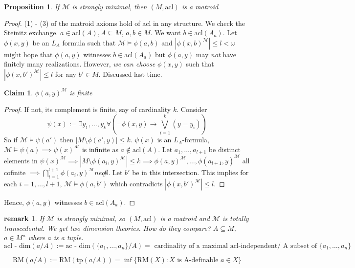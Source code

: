 \documentclass[letterpaper, 12pt]{article}
\newcommand{\fin}{\qquad \quad \hfill \framebox[1.75mm][l]{\,}}
\newcommand{\cM}{\mathcal{M}}
\newcommand{\tp}{\mbox{tp}}
\newcommand{\RM}{\mbox{RM}}
\providecommand{\abs}[1]{\left\lvert#1\right\rvert}
\newcommand{\acl}{\mbox{acl}}
\theoremstyle{stdthm}
\newtheorem{prop}[thm]{Proposition}
\theoremstyle{stddef}
\newtheorem{rem}[thm]{remark} %
\theoremstyle{stdnonum}
\newtheorem{claim}{Claim}
\theoremstyle{stdqands}
\theoremstyle{stdbold}
\begin{document}
\begin{prop}
If $\cM $ is strongly minimal, then $(M,\acl)$ is a matroid
\end{prop}

\begin{proof}
(1) - (3) of the matroid axioms hold of acl in any structure. We check the Steinitz exchange. $a \in \acl(A), A\subseteq M$, $a,b \in M$. We want $b \in \acl(A_a)$. Let $\phi(x,y)$ be an $L_A$ formula such that $\cM \models \phi(a,b)$ and $|\phi(x,b)^\cM| \leq l < \omega$ might hope that $\phi(a,y)$ witnesses $b \in \acl(A_a)$ but $\phi(a,y)$ may \emph{not} have finitely many realizations. However, \emph{we can choose} $\phi(x,y)$ such that $|\phi(x,b')^\cM| \leq l$ for any $b' \in M$. Discussed last time. 

\begin{claim}
$\phi(a,y)^\cM$ is finite
\end{claim}

\begin{proof}
If not, its complement is finite, say of cardinality $k$. Consider 
\[ \psi(x) := \exists y_1,\dots,y_k \forall \left(\neg \phi(x,y) \to \bigvee_{i=1}^k (y= y_i) \right) \]
So if $\cM \models \psi(a')$ then $\abs{ M \setminus \phi(a',y)} \leq k$. $\psi(x)$ is an $L_A$-formula, $\cM \models \psi(a) \implies \psi(x)^\cM$ is infinite as $a \notin \acl(A)$. Let $a_1,\dots, a_{l+1}$ be distinct elements in $\psi(x)^\cM \implies \abs{M \setminus \phi(a_i,y)^\cM} \leq k \implies \phi(a,y)^\cM,\dots,\phi(a_{l+1},y)^\cM$ all cofinite $\implies \bigcap_{i=1}^{l+1} \phi(a_i,y)^\cM neq \emptyset$. Let $b'$ be in this intersection. This implies for each $i=1,\dots, l+1$, $\cM \models \phi(a,b')$ which contradicts $|\phi(x,b')^\cM| \leq l$. 
\end{proof}
 Hence, $\phi(a,y)$ witnesses $b \in \acl(A_a)$.  
\end{proof}


\begin{rem}
If $\cM$ is strongly minimal, so $(M,\acl)$ is a matroid and $\cM$ is totally transcedental. We get two dimension theories. How do they compare? $A \subseteq M$, $a \in M^n$ where $a$ is a tuple. 
\[ \mbox{acl - dim}(a/A) := \mbox{ac - dim}(\{a_1,\dots, a_n\}/A) = \mbox{ cardinality of a maximal acl-independent/ A subset of }\{a_1,\dots,a_n\} \]

\[\RM(a/A) := \RM(\tp(a/A)) = \inf \{\RM(X) : X \mbox{ is A-definable } a\in X\} \]
\end{rem}
\end{document}
